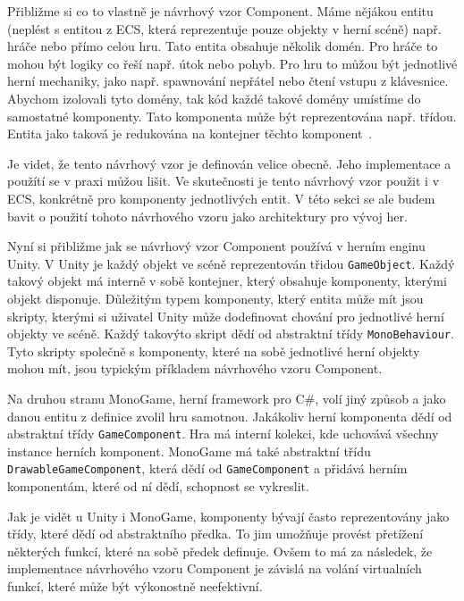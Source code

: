 Přibližme si co to vlastně je návrhový vzor Component. Máme nějákou entitu (neplést s entitou z ECS, která reprezentuje pouze objekty v herní scéně) např. hráče nebo přímo celou hru. Tato entita obsahuje několik domén. Pro hráče to mohou být logiky co řeší např. útok nebo pohyb. Pro hru to můžou být jednotlivé herní mechaniky, jako např. spawnování nepřátel nebo čtení vstupu z klávesnice. Abychom izolovali tyto domény, tak kód každé takové domény umístíme do samostatné komponenty. Tato komponenta může být reprezentována např. třídou. Entita jako taková je redukována na kontejner těchto komponent~\cite{nystrom2014game}.


Je videt, že tento návrhový vzor je definován velice obecně. Jeho implementace a použítí se v praxi můžou lišit. Ve skutečnosti je tento návrhový vzor použit i v ECS, konkrétně pro komponenty jednotlivých entit. V této sekci se ale budem bavit o použití tohoto návrhového vzoru jako architektury pro vývoj her.

Nyní si přibližme jak se návrhový vzor Component používá v herním enginu Unity. V Unity je každý objekt ve scéně reprezentován třidou \verb|GameObject|. Každý takový objekt má interně v sobě kontejner, který obsahuje komponenty, kterými objekt disponuje. Důležitým typem komponenty, který entita může mít jsou skripty, kterými si uživatel Unity může dodefinovat chování pro jednotlivé herní objekty ve scéně. Každý takovýto skript dědí od abstraktní třídy \verb|MonoBehaviour|. Tyto skripty společně s komponenty, které na sobě jednotlivé herní objekty mohou mít, jsou typickým příkladem návrhového vzoru Component.

Na druhou stranu MonoGame, herní framework pro C\#, volí jiný způsob a jako danou entitu z definice zvolil hru samotnou. Jakákoliv herní komponenta dědí od abstraktní třídy \verb|GameComponent|. Hra má interní kolekci, kde uchovává všechny instance herních komponent. MonoGame má také abstraktní třídu \verb|DrawableGameComponent|, která dědí od \verb|GameComponent| a přidává herním komponentám, které od ní dědí, schopnost se vykreslit.

Jak je vidět u Unity i MonoGame, komponenty bývají často reprezentovány jako třídy, které dědí od abstraktního předka. To jim umožňuje provést přetížení některých funkcí, které na sobě předek definuje. Ovšem to má za následek, že implementace návrhového vzoru Component je závislá na volání virtualních funkcí, které může být výkonostně neefektivní.

